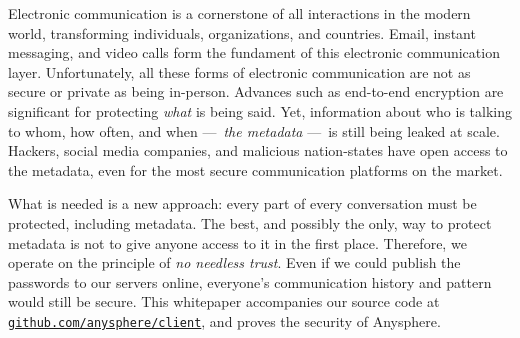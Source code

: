 





Electronic communication is a cornerstone of all interactions in the modern world, transforming individuals, organizations, and countries. Email, instant messaging, and video calls form the fundament of this electronic communication layer. Unfortunately, all these forms of electronic communication are not as secure or private as being in-person. Advances such as end-to-end encryption are significant for protecting \textit{what} is being said. Yet, information about who is talking to whom, how often, and when — \textit{the metadata} — is still being leaked at scale. Hackers, social media companies, and malicious nation-states have open access to the metadata, even for the most secure communication platforms on the market.

What is needed is a new approach: every part of every conversation must be protected, including metadata. The best, and possibly the only, way to protect metadata is not to give anyone access to it in the first place. Therefore, we operate on the principle of \textit{no needless trust}. Even if we could publish the passwords to our servers online, everyone's communication history and pattern would still be secure. This whitepaper accompanies our source code at {\tt \href{https://github.com/anysphere/client}{github.com/anysphere/client}}, and proves the security of Anysphere.